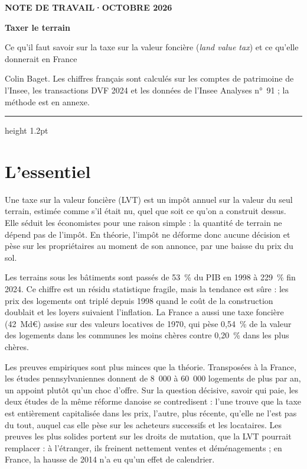\documentclass[11pt,a4paper]{article}
\begin{document}
\renewcommand{\figurename}{Figure}\renewcommand{\tablename}{Tableau}

\thispagestyle{empty}
\vspace*{0.6cm}
{\footnotesize\color{ocre}\bfseries NOTE DE TRAVAIL\quad·\quad OCTOBRE 2026\par}
\vspace{8pt}
{\fontsize{24}{28}\selectfont\bfseries\color{bleu}Taxer le terrain\par}
\vspace{6pt}
{\large Ce qu'il faut savoir sur la taxe sur la valeur foncière (\emph{land value tax}) et ce
qu'elle donnerait en France\par}
\vspace{8pt}
{\small Colin Baget. Les chiffres français sont calculés sur les comptes de patrimoine de l'Insee,
les transactions DVF 2024 et les données de l'Insee Analyses n°~91 ; la méthode est en annexe.\par}
\vspace{6pt}
{\color{bleu}\hrule height 1.2pt}
\vspace{4pt}

\section*{L'essentiel}

Une taxe sur la valeur foncière (LVT) est un impôt annuel sur la valeur du seul terrain, estimée
comme s'il était nu, quel que soit ce qu'on a construit dessus. Elle séduit les économistes pour
une raison simple : la quantité de terrain ne dépend pas de l'impôt. En théorie, l'impôt ne déforme donc aucune décision et pèse sur les
propriétaires au moment de son annonce, par une baisse du prix du sol.

Les terrains sous les bâtiments sont passés de 53~\% du PIB en 1998 à 229~\% fin 2024. Ce chiffre
est un résidu statistique fragile, mais la tendance est sûre : les prix des logements ont triplé depuis 1998 quand le coût de la construction doublait et
les loyers suivaient l'inflation. La France a aussi une taxe foncière (42~Md€) assise sur des
valeurs locatives de 1970, qui pèse 0,54~\% de la valeur des logements dans les communes les moins
chères contre 0,20~\% dans les plus chères.

Les preuves empiriques sont plus minces que la théorie. Transposées à la France, les études
pennsylvaniennes donnent de 8~000 à 60~000 logements de plus par an, un appoint plutôt qu'un
choc d'offre. Sur la question décisive, savoir qui paie, les deux études de la même réforme
danoise se contredisent : l'une trouve que la taxe est entièrement capitalisée dans les prix,
l'autre, plus récente, qu'elle ne l'est pas du tout, auquel cas elle pèse sur les acheteurs
successifs et les locataires. Les preuves les plus solides portent sur les droits de mutation,
que la LVT pourrait remplacer : à l'étranger, ils freinent nettement ventes et déménagements ; en
France, la hausse de 2014 n'a eu qu'un effet de calendrier.
\end{document}
